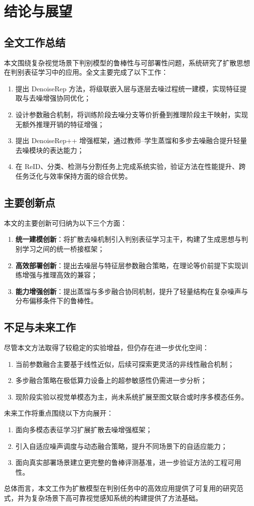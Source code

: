 ﻿\setlength{\baselineskip}{20pt}
\chapter{结论与展望}
\label{cha:chap5}

\section{全文工作总结}
本文围绕复杂视觉场景下判别模型的鲁棒性与可部署性问题，系统研究了扩散思想在判别表征学习中的应用。全文主要完成了以下工作：
\begin{enumerate}
  \item 提出 DenoiseRep 方法，将级联嵌入层与逐层去噪过程统一建模，实现特征提取与去噪增强协同优化；
  \item 设计参数融合机制，将训练阶段去噪分支等价折叠到推理阶段主干映射，实现无额外推理开销的特征增强；
  \item 提出 DenoiseRep++ 增强框架，通过教师--学生蒸馏和多步去噪融合提升轻量去噪模块的表达能力；
  \item 在 ReID、分类、检测与分割任务上完成系统实验，验证方法在性能提升、跨任务泛化与效率保持方面的综合优势。
\end{enumerate}

\section{主要创新点}
本文的主要创新可归纳为以下三个方面：
\begin{enumerate}
  \item \textbf{统一建模创新}：将扩散去噪机制引入判别表征学习主干，构建了生成思想与判别学习之间的统一桥接框架；
  \item \textbf{高效部署创新}：提出去噪层与特征层参数融合策略，在理论等价前提下实现训练增强与推理高效的兼容；
  \item \textbf{能力增强创新}：提出蒸馏与多步融合协同机制，提升了轻量结构在复杂噪声与分布偏移条件下的鲁棒性。
\end{enumerate}

\section{不足与未来工作}
尽管本文方法取得了较稳定的实验增益，但仍存在进一步优化空间：
\begin{enumerate}
  \item 当前参数融合主要基于线性近似，后续可探索更灵活的非线性融合机制；
  \item 多步融合策略在极低算力设备上的超参敏感性仍需进一步分析；
  \item 现阶段实验以视觉单模态为主，尚未系统扩展至图文联合或时序多模态任务。
\end{enumerate}

未来工作将重点围绕以下方向展开：
\begin{enumerate}
  \item 面向多模态表征学习扩展扩散去噪增强框架；
  \item 引入自适应噪声调度与动态融合策略，提升不同场景下的自适应能力；
  \item 面向真实部署场景建立更完整的鲁棒评测基准，进一步验证方法的工程可用性。
\end{enumerate}

总体而言，本文工作为扩散模型在判别任务中的高效应用提供了可复用的研究范式，并为复杂场景下高可靠视觉感知系统的构建提供了方法基础。
